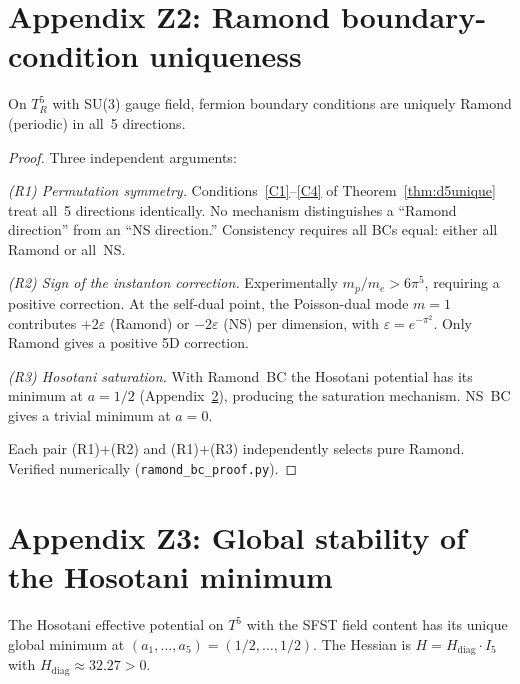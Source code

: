\section{Appendix Z2: Ramond boundary-condition uniqueness}
\label{app:ramond}

\begin{theorem}\label{thm:ramond}
On $T^5_R$ with SU(3) gauge field, fermion boundary conditions are
uniquely Ramond (periodic) in all~5 directions.
\end{theorem}

\begin{proof}
Three independent arguments:

\emph{(R1) Permutation symmetry.}
Conditions~\ref{C1}--\ref{C4} of Theorem~\ref{thm:d5unique} treat all~5
directions identically. No mechanism distinguishes a ``Ramond direction''
from an ``NS direction.'' Consistency requires all BCs equal: either all
Ramond or all~NS.

\emph{(R2) Sign of the instanton correction.}
Experimentally $m_p/m_e>6\pi^5$, requiring a positive correction.
At the self-dual point, the Poisson-dual mode $m=1$ contributes
$+2\varepsilon$ (Ramond) or $-2\varepsilon$ (NS) per dimension, with
$\varepsilon=e^{-\pi^2}$. Only Ramond gives a positive 5D correction.

\emph{(R3) Hosotani saturation.}
With Ramond~BC the Hosotani potential has its minimum at $a=1/2$
(Appendix~\ref{app:hosotani}), producing the saturation mechanism.
NS~BC gives a trivial minimum at $a=0$.

Each pair (R1)+(R2) and (R1)+(R3) independently selects pure Ramond.
Verified numerically (\texttt{ramond\_bc\_proof.py}).
\end{proof}

\section{Appendix Z3: Global stability of the Hosotani minimum}
\label{app:hosotani}

\begin{theorem}\label{thm:hosotani}
The Hosotani effective potential on $T^5$ with the SFST field content
has its unique global minimum at $(a_1,\ldots,a_5)=(1/2,\ldots,1/2)$.
The Hessian is $H=H_{\mathrm{diag}}\cdot I_5$ with
$H_{\mathrm{diag}}\approx 32.27>0$.
\end{theorem}

